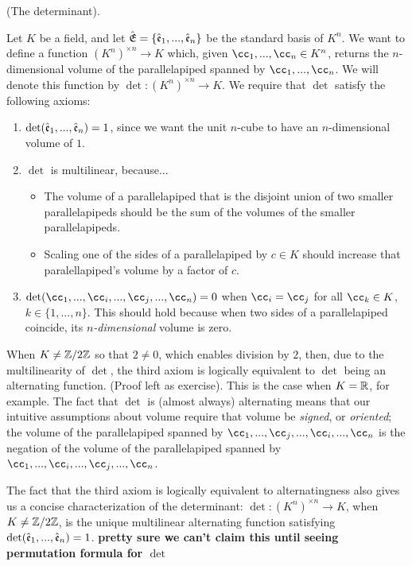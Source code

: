 \begin{defn}
\label{ch::exterior_pwrs::defn::determinant}
    (The determinant).
    
    Let $K$ be a field, and let ${\hat{\mathfrak{E}}} = \{\hat{\mathfrak{e}}_1, ..., \hat{\mathfrak{e}}_n\}$ be the standard basis of $K^n$. We want to define a function $(K^n)^{\times n} \rightarrow K$ which, given $\cc_1, ..., \cc_n \in K^n$, returns the $n$-dimensional volume of the parallelapiped spanned by $\cc_1, ..., \cc_n$. We will denote this function by $\det:(K^n)^{\times n} \rightarrow K$. We require that $\det$ satisfy the following axioms:
    
    \begin{enumerate}
        \item $\det(\hat{\mathfrak{e}}_1, ..., \hat{\mathfrak{e}}_n) = 1$, since we want the unit $n$-cube to have an $n$-dimensional volume of $1$.
        \item $\det$ is multilinear, because...
        \begin{itemize}
            \item The volume of a parallelapiped that is the disjoint union of two smaller parallelapipeds should be the sum of the volumes of the smaller parallelapipeds.
            \item Scaling one of the sides of a parallelapiped by $c \in K$ should increase that paralellapiped's volume by a factor of $c$. 
        \end{itemize}
        \item $\det(\cc_1, ..., \cc_i, ..., \cc_j, ..., \cc_n) = 0$ when $\cc_i = \cc_j$ for all $\cc_k \in K$, $k \in \{1, ..., n\}$. This should hold because when two sides of a parallelapiped coincide, its \textit{$n$-dimensional} volume is zero.
    \end{enumerate}
    
    When $K \neq \mathbb{Z}/2\mathbb{Z}$ so that $2 \neq 0$, which enables division by $2$, then, due to the multilinearity of $\det$, the third axiom is logically equivalent to $\det$ being an alternating function. (Proof left as exercise). This is the case when $K = \mathbb{R}$, for example. The fact that $\det$ is (almost always) alternating means that our intuitive assumptions about volume require that volume be \textit{signed}, or \textit{oriented}; the volume of the parallelapiped spanned by $\cc_1, ..., \cc_j, ..., \cc_i, ..., \cc_n$ is the negation of the volume of the parallelapiped spanned by $\cc_1, ..., \cc_i, ..., \cc_j, ..., \cc_n$.
    
    The fact that the third axiom is logically equivalent to alternatingness also gives us a concise characterization of the determinant: $\det:(K^n)^{\times n} \rightarrow K$, when $K \neq \mathbb{Z}/2\mathbb{Z}$, is the unique multilinear alternating function satisfying $\det(\hat{\mathfrak{e}}_1, ..., \hat{\mathfrak{e}}_n) = 1$. \textbf{pretty sure we can't claim this until seeing permutation formula for $\det$}
\end{defn}


